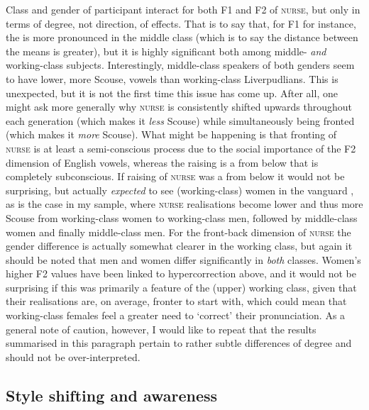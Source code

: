Class and gender of participant interact for both F1 and F2 of \textsc{nurse}, but only in terms of degree, not direction, of effects.
That is to say that, for F1 for instance, the  is more pronounced in the middle class (which is to say the distance between the means is greater), but it is highly significant both among middle- \emph{and} working-class subjects.
Interestingly, middle-class speakers of both genders seem to have lower, more Scouse, vowels than working-class Liverpudlians.
This is unexpected, but it is not the first time this issue has come up.
After all, one might ask more generally why \textsc{nurse} is consistently shifted upwards throughout each generation (which makes it \emph{less} Scouse) while simultaneously being fronted (which makes it \emph{more} Scouse).
What might be happening is that fronting of \textsc{nurse} is at least a semi-conscious process due to the social importance of the F2 dimension of English vowels, whereas the raising is a  from below that is completely subconscious.
If raising of \textsc{nurse} was a  from below it would not be surprising, but actually \emph{expected} to see (working-class) women in the vanguard \parencite[cf.][292--293]{labov2001a}, as is the case in my sample, where \textsc{nurse} realisations become lower and thus more Scouse from working-class women to working-class men, followed by middle-class women and finally middle-class men.
For the front-back dimension of \textsc{nurse} the gender difference is actually somewhat clearer in the working class, but again it should be noted that men and women differ significantly in \emph{both} classes.
Women's higher F2 values have been linked to hypercorrection above, and it would not be surprising if this was primarily a feature of the (upper) working class, given that their realisations are, on average, fronter to start with, which could mean that working-class females feel a greater need to `correct' their pronunciation.
As a general note of caution, however, I would like to repeat that the results summarised in this paragraph pertain to rather subtle differences of degree and should not be over-interpreted.

\subsection{Style shifting and awareness}
\label{prod.disc.nurse.style}

